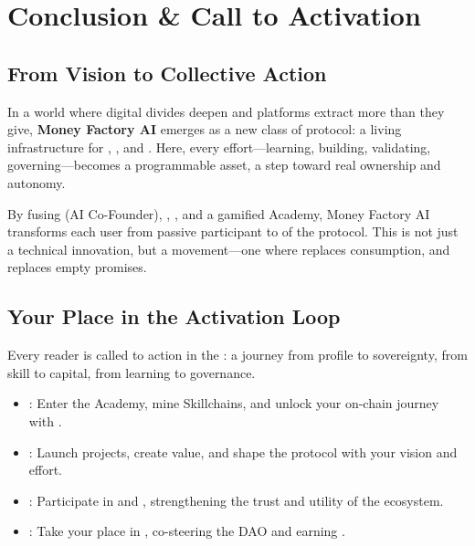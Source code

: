 
\section{Conclusion \& Call to Activation}


\subsection*{From Vision to Collective Action}
In a world where digital divides deepen and platforms extract more than they give, \textbf{Money Factory AI} emerges as a new class of protocol: a living infrastructure for , , and . Here, every effort—learning, building, validating, governing—becomes a programmable asset, a step toward real ownership and autonomy.

By fusing  (AI Co-Founder), , , and a gamified Academy, Money Factory AI transforms each user from passive participant to  of the protocol. This is not just a technical innovation, but a movement—one where  replaces consumption, and  replaces empty promises.

\subsection*{Your Place in the Activation Loop}
Every reader is called to action in the : a journey from profile to sovereignty, from skill to capital, from learning to governance.

\begin{itemize}
  \item {}: Enter the Academy, mine Skillchains\texttrademark{}, and unlock your on-chain journey with .
  \item {}: Launch projects, create value, and shape the protocol with your vision and effort.
  \item {}: Participate in  and , strengthening the trust and utility of the ecosystem.
  \item {}: Take your place in , co-steering the DAO and earning .
\end{itemize}

